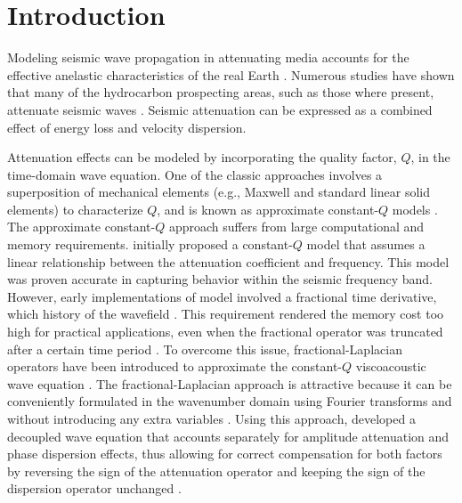 \section{Introduction}
Modeling seismic wave propagation in attenuating media accounts for the effective anelastic characteristics of the real Earth \cite[]{carc07}. Numerous studies have shown that many of the hydrocarbon prospecting areas, such as those where  present,  attenuate seismic waves \cite[]{dvorkin06}. Seismic attenuation can be expressed as a combined effect of energy loss and velocity dispersion. 

Attenuation effects can be modeled by incorporating the quality factor, $Q$, in the time-domain wave equation. One of the classic approaches involves a superposition of mechanical elements (e.g., Maxwell and standard linear solid elements) to characterize $Q$, and is known as approximate constant-$Q$ models \cite[]{liu76,blanch95,carc07,zhu13a}. The approximate constant-$Q$ approach suffers from large computational and memory requirements. \cite{kja79} initially proposed a constant-$Q$ model that assumes a linear relationship between the attenuation coefficient and frequency. This model was proven accurate in capturing  behavior within the seismic frequency band. However, early implementations of  model involved a fractional time derivative, which  history of the wavefield \cite[]{caputo71}. This requirement rendered the memory cost too high for practical applications, even when the fractional operator was truncated after a certain time period \cite[]{pod99,carc02,carc09}. To overcome this issue, fractional-Laplacian operators \cite[]{chenholm04} have been introduced to approximate the constant-$Q$ viscoacoustic wave equation \cite[]{carc10,zhu14a}. The fractional-Laplacian approach is attractive because it can be conveniently formulated in the wavenumber domain using Fourier transforms and without introducing any extra variables \cite[]{carc10}. Using this approach, \cite{zhu14a} developed a decoupled wave equation that accounts separately for amplitude attenuation and phase dispersion effects, thus allowing for correct compensation for both factors by reversing the sign of the attenuation operator and keeping the sign of the dispersion operator unchanged \cite[]{zhu14c}.

